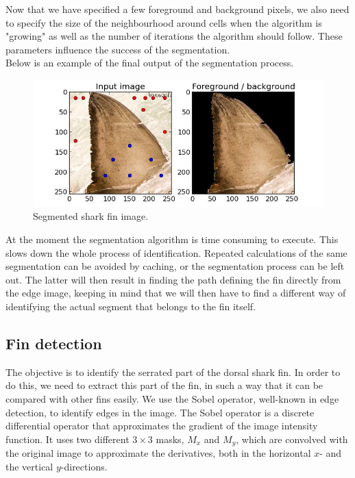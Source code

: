 \documentclass[a4paper,10pt]{article}
\begin{document}
Now that we have specified a few foreground and background pixels, we also
need to specify the size of the neighbourhood around cells when the algorithm
is "growing" as well as the number of iterations the algorithm should follow.
These parameters influence the success of the
segmentation. \\

Below is an example of the final output of the segmentation process. \\

\begin{figure}[H]
 \centering
 \includegraphics[width=5in]{segmentation.jpg}
 \caption{Segmented shark fin image.}
 \label{segmentation1}
\end{figure}

At the moment the segmentation algorithm is time consuming to execute.
This slows down the whole process of identification.  Repeated calculations of the
  same segmentation can be avoided by caching, 
or the segmentation process can be left out.  The latter will then result in
finding the path defining the fin directly from the edge image, keeping 
in mind that we will then have to find a different way of identifying the
  actual segment that belongs to the fin itself. 

\subsection{Fin detection}
The objective is to identify the serrated part of the dorsal shark fin. In order
to do this, we need to extract this part of the fin, in such a way that it can be 
compared with other fins easily.
We use the
Sobel operator,
well-known in edge detection, to identify edges in the image.
The Sobel operator is a discrete differential operator that approximates the
gradient of the image intensity function.  It uses two different $3 \times 3$
masks, $M_x$ and $M_y$, which are convolved with the original image to
approximate the
derivatives, both in the horizontal $x$-
and the vertical $y$-directions.  \\
\end{document}
